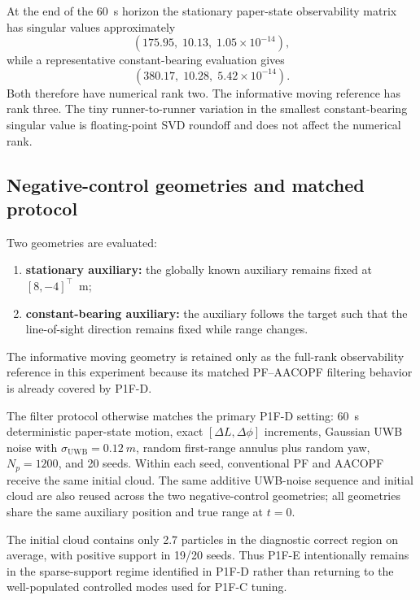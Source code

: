 At the end of the \SI{60}{s} horizon the stationary paper-state observability matrix has singular values approximately
\begin{equation}
    (175.95,\;10.13,\;1.05\times 10^{-14}),
\end{equation}
while a representative constant-bearing evaluation gives
\begin{equation}
    (380.17,\;10.28,\;5.42\times 10^{-14}).
\end{equation}
Both therefore have numerical rank two. The informative moving reference has rank three. The tiny runner-to-runner variation in the smallest constant-bearing singular value is floating-point SVD roundoff and does not affect the numerical rank.

\subsection{Negative-control geometries and matched protocol}
Two geometries are evaluated:
\begin{enumerate}
    \item \textbf{stationary auxiliary:} the globally known auxiliary remains fixed at $[8,-4]^\top$~m;
    \item \textbf{constant-bearing auxiliary:} the auxiliary follows the target such that the line-of-sight direction remains fixed while range changes.
\end{enumerate}
The informative moving geometry is retained only as the full-rank observability reference in this experiment because its matched PF--AACOPF filtering behavior is already covered by P1F-D.

The filter protocol otherwise matches the primary P1F-D setting: \SI{60}{s} deterministic paper-state motion, exact $[\Delta L,\Delta\phi]$ increments, Gaussian UWB noise with $\sigma_{\mathrm{UWB}}=\SI{0.12}{m}$, random first-range annulus plus random yaw, $N_p=1200$, and 20 seeds. Within each seed, conventional PF and AACOPF receive the same initial cloud. The same additive UWB-noise sequence and initial cloud are also reused across the two negative-control geometries; all geometries share the same auxiliary position and true range at $t=0$.

The initial cloud contains only 2.7 particles in the diagnostic correct region on average, with positive support in 19/20 seeds. Thus P1F-E intentionally remains in the sparse-support regime identified in P1F-D rather than returning to the well-populated controlled modes used for P1F-C tuning.

